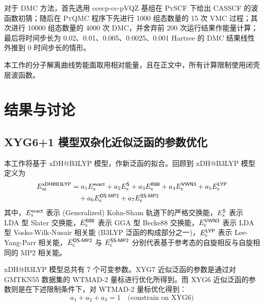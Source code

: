 对于 DMC 方法，首先选用 ccecp-cc-pVQZ 基组在 \textsc{PySCF} 下给出 CASSCF 的波函数初猜；随后在 \textsc{PyQMC} 程序下先进行 1000 组态数量的 15 次 VMC 过程；其次进行 10000 组态数量的 4000 次 DMC，并舍弃前 200 次运行结果作能量计算；最后将时间步长为 0.02、0.01、0.005、0.0025、0.001 Hartree 的 DMC 结果线性外推到 0 时间步长的情形。

本工作的分子解离曲线势能面取用相对能量，且在正文中，所有计算限制使用闭壳层波函数。

\section{结果与讨论}
\label{sec.2.iepa-results}

\subsection{XYG6+1 模型双杂化近似泛函的参数优化}

本工作将基于 xDH@B3LYP 模型\cite{Zhang-Xu.JPCL.2021}，作新泛函的拟合。回顾到 xDH@B3LYP 模型定义为
\begin{align}
  E_{\textsf{xc}}^{\textsf{xDH@B3LYP}} &= a_1 E_{\textsf{x}}^{\textsf{exact}} + a_2 E_{\textsf{x}}^{\textsf{S}} + a_3 E_{\textsf{x}}^{\textsf{B88}} + a_4 E_{\textsf{c}}^{\textsf{VWN3}} + a_5 E_{\textsf{c}}^{\textsf{LYP}} \notag \\
  &\quad + a_6 E_{\textsf{c}}^{\textsf{OS-MP2}} + a_7 E_{\textsf{c}}^{\textsf{SS-MP2}}
\end{align}
其中，$E_{\textsf{x}}^{\textsf{exact}}$ 表示 (Generalized) Kohn-Sham 轨道下的严格交换能，$E_{\textsf{x}}^{\textsf{S}}$ 表示 LDA 型 Slater 交换能\cite{Bloch-Bloch.ZP.1929,Dirac-Dirac.MPCPS.1930}，$E_{\textsf{x}}^{\textsf{B88}}$ 表示 GGA 型 Becke88 交换能\cite{Becke-Becke.PRA.1988}，$E_{\textsf{c}}^{\textsf{VWN3}}$ 表示 LDA 型 Vosko-Wilk-Nusair 相关能\cite{Vosko-Nusair.CJP.1980} (B3LYP 泛函的构成部分之一\cite{Becke-Becke.JCP.1993,Stephens-Frisch.JPC.1994})，$E_{\textsf{c}}^{\textsf{LYP}}$ 表示 Lee-Yang-Parr 相关能\cite{Lee-Parr.PRB.1988}，$E_{\textsf{c}}^{\textsf{OS-MP2}}$ 与 $E_{\textsf{c}}^{\textsf{SS-MP2}}$ 分别代表基于参考态的自旋相反与自旋相同的 MP2 相关能。

xDH@B3LYP 模型总共有 7 个可变参数。XYG7 近似泛函的参数是通过对 GMTKN55 数据集的 WTMAD-2 量标进行优化所得到。而 XYG6 近似泛函的参数则是在下述限制条件下，对 WTMAD-2 量标优化得到：
\begin{equation}
  \label{eq.2.constrain-xyg6}
  a_1 + a_2 + a_3 = 1 \quad \text{(constrain on XYG6)}
\end{equation}

